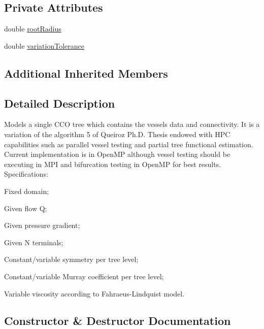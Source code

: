 \subsection*{Private Attributes}
\begin{DoxyCompactItemize}
\item 
double \hyperlink{class_f_r_r_va_vi_opt_c_c_o_s_tree_a459526bb36610ba6131cdfd788f9025b}{root\+Radius}
\item 
double \hyperlink{class_f_r_r_va_vi_opt_c_c_o_s_tree_a3652da4e84bd04dcde60101b06f2cc08}{variation\+Tolerance}
\end{DoxyCompactItemize}
\subsection*{Additional Inherited Members}


\subsection{Detailed Description}
Models a single C\+CO tree which contains the vessel\textquotesingle{}s data and connectivity. It is a variation of the algorithm 5 of Queiroz Ph.\+D. Thesis endowed with H\+PC capabilities such as parallel vessel testing and partial tree functional estimation. Current implementation is in Open\+MP although vessel testing should be executing in M\+PI and bifurcation testing in Open\+MP for best results. Specifications\+:
\begin{DoxyItemize}
\item Fixed domain;
\item Given flow Q;
\item Given pressure gradient;
\item Given N terminals;
\item Constant/variable symmetry per tree level;
\item Constant/variable Murray coefficient per tree level;
\item Variable viscosity according to Fahraeus-\/\+Lindquist model. 
\end{DoxyItemize}

\subsection{Constructor \& Destructor Documentation}
